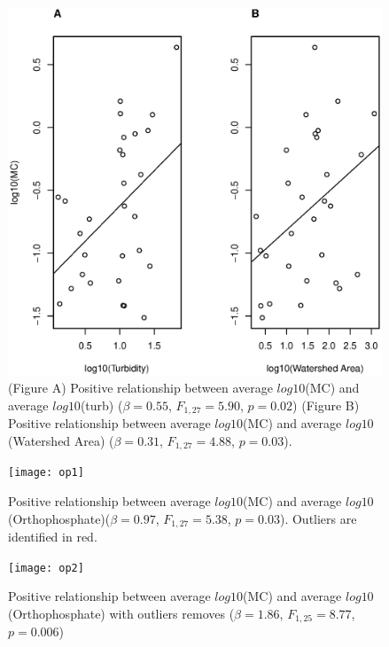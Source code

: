\begin{figure}
\includegraphics[width=\textwidth, height=11cm]{figures/plot2}
\caption{
(Figure A) Positive relationship between average $log10$(MC) and average $log10$(turb) ($\beta=0.55$, $F_{{1,27}}=5.90$, $p=0.02$)
(Figure B) Positive relationship between average $log10$(MC) and average  $log10$(Watershed Area) ($\beta=0.31$, $F_{{1,27}}=4.88$, $p=0.03$). 
}
\label{fig:plot2}
\end{figure}



\begin{figure}[p]
	\texttt{[image: op1]}
	\caption{Positive relationship between average $log10$(MC) and average $log10$(Orthophosphate)($\beta=0.97$, $F_{{1,27}}=5.38$, $p=0.03$). Outliers are identified in red. }
	\label{fig:op1}
\end{figure}

\begin{figure}[p]
	\texttt{[image: op2]}
	\caption{Positive relationship between average $log10$(MC) and average $log10$(Orthophosphate) with outliers removes ($\beta=1.86$, $F_{{1,25}}=8.77$, $p=0.006$) }
	\label{fig:op2}
\end{figure}



